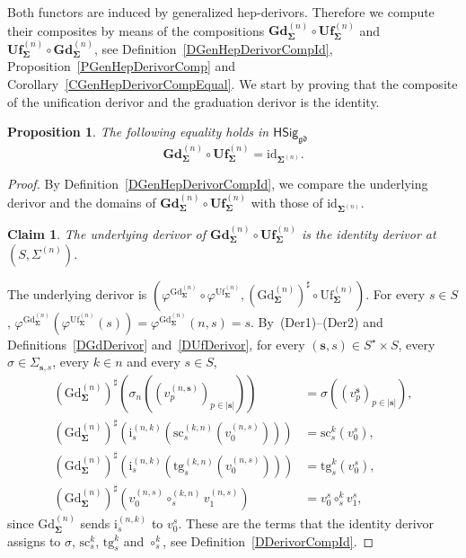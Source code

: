 \documentclass[a4paper, reqno]{amsbook}
\newcommand{\bb}[1]{\ensuremath{\lvert #1 \rvert}}
\newcommand{\sig}[1]{\mathbf{#1}}             %
\newcommand{\gd}{\mathfrak{gd}}              %
\newcommand{\id}{\mathrm{id}}
\newcommand{\src}{\mathrm{sc}}
\newcommand{\tgt}{\mathrm{tg}}
\newcommand{\Gd}{\mathrm{Gd}}
\newcommand{\Uf}{\mathrm{Uf}}
\newcommand{\bGd}{\mathbf{Gd}}
\newcommand{\bUf}{\mathbf{Uf}}
\theoremstyle{plain}
\newtheorem{proposition}[theorem]{Proposition}
\newtheorem{claim}[theorem]{Claim}
\theoremstyle{definition}
\begin{document}
Both functors are induced by generalized hep-derivors.
Therefore we compute their composites by means of the compositions $\bGd^{(n)}_{\sig{\Sigma}}\circ\bUf^{(n)}_{\sig{\Sigma}}$ and $\bUf^{(n)}_{\sig{\Sigma}}\circ\bGd^{(n)}_{\sig{\Sigma}}$, see Definition~\ref{DGenHepDerivorCompId}, Proposition~\ref{PGenHepDerivorComp} and Corollary~\ref{CGenHepDerivorCompEqual}.
We start by proving that the composite of the unification derivor and the graduation derivor is the identity.

\begin{proposition}\label{PGdUfDerivorId}
The following equality holds in $\mathsf{HSig}_{\gd}$
$$
\bGd^{(n)}_{\sig{\Sigma}}\circ\bUf^{(n)}_{\sig{\Sigma}}=\id_{\sig{\Sigma}^{(n)}}.
$$
\end{proposition}
\begin{proof}
By Definition~\ref{DGenHepDerivorCompId}, we compare the underlying derivor and the domains of $\bGd^{(n)}_{\sig{\Sigma}}\circ\bUf^{(n)}_{\sig{\Sigma}}$ with those of $\id_{\sig{\Sigma}^{(n)}}$.
\begin{claim}\label{ClGdUfDerivorIdA}
The underlying derivor of $\bGd^{(n)}_{\sig{\Sigma}}\circ\bUf^{(n)}_{\sig{\Sigma}}$ is the identity derivor at $(S,\Sigma^{(n)})$.
\end{claim}
The underlying derivor is $(\varphi^{\Gd^{(n)}_{\sig{\Sigma}}}\circ\varphi^{\Uf^{(n)}_{\sig{\Sigma}}},(\Gd^{(n)}_{\sig{\Sigma}})^{\sharp}\circ\Uf^{(n)}_{\sig{\Sigma}})$.
For every $s\in S$, $\varphi^{\Gd^{(n)}_{\sig{\Sigma}}}(\varphi^{\Uf^{(n)}_{\sig{\Sigma}}}(s))=\varphi^{\Gd^{(n)}_{\sig{\Sigma}}}(n,s)=s$.
By~(Der1)--(Der2) and Definitions~\ref{DGdDerivor} and~\ref{DUfDerivor}, for every $(\mathbf{s},s)\in S^{\star}\times S$, every $\sigma\in\Sigma_{\mathbf{s},s}$, every $k\in n$ and every $s\in S$,
\begin{align*}
(\Gd^{(n)}_{\sig{\Sigma}})^{\sharp}\left(\sigma_{n}\left((v^{(n,\mathbf{s})}_{p})_{p\in\bb{\mathbf{s}}}\right)\right)&=\sigma\left((v^{\mathbf{s}}_{p})_{p\in\bb{\mathbf{s}}}\right),\\
(\Gd^{(n)}_{\sig{\Sigma}})^{\sharp}\left(\mathrm{i}^{(n,k)}_{s}\left(\src^{(k,n)}_{s}(v^{(n,s)}_{0})\right)\right)&=\src^{k}_{s}(v^{s}_{0}),\\
(\Gd^{(n)}_{\sig{\Sigma}})^{\sharp}\left(\mathrm{i}^{(n,k)}_{s}\left(\tgt^{(k,n)}_{s}(v^{(n,s)}_{0})\right)\right)&=\tgt^{k}_{s}(v^{s}_{0}),\\
(\Gd^{(n)}_{\sig{\Sigma}})^{\sharp}\left(v^{(n,s)}_{0}\circ^{(k,n)}_{s}v^{(n,s)}_{1}\right)&=v^{s}_{0}\circ^{k}_{s}v^{s}_{1},
\end{align*}
since $\Gd^{(n)}_{\sig{\Sigma}}$ sends $\mathrm{i}^{(n,k)}_{s}$ to $v^{s}_{0}$.
These are the terms that the identity derivor assigns to $\sigma$, $\src^{k}_{s}$, $\tgt^{k}_{s}$ and $\circ^{k}_{s}$, see Definition~\ref{DDerivorCompId}.


\end{proof}
\end{document}

